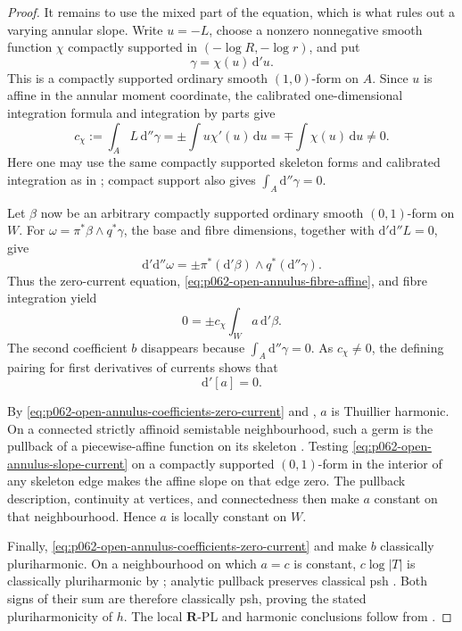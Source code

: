 \begin{proof}
It remains to use the mixed part of the equation, which is what rules out
a varying annular slope.  Write \(u=-L\), choose a nonzero nonnegative
smooth function \(\chi\) compactly supported in
\(( -\log R,-\log r)\), and put
\[
                         \gamma=\chi(u)\,\mathrm d'u.
\]
This is a compactly supported ordinary smooth \((1,0)\)-form on \(A\).
Since \(u\) is affine in the annular moment coordinate, the calibrated
one-dimensional integration formula and integration by parts give
\[
 c_\chi:=\int_A L\,\mathrm d''\gamma
 =\mathord\pm\int u\chi'(u)\,\mathrm du
 =\mathord\mp\int\chi(u)\,\mathrm du\ne0.
\tag{\(***\)}\label{eq:p062-open-annulus-nonzero-pairing}
\]
Here one may use the same compactly supported skeleton forms and
calibrated integration as in ; compact
support also gives \(\int_A\mathrm d''\gamma=0\).

Let \(\beta\) now be an arbitrary compactly supported ordinary smooth
\((0,1)\)-form on \(W\).  For
\(\omega=\pi^*\beta\wedge q^*\gamma\), the base and fibre dimensions,
together with \(\mathrm d'\mathrm d''L=0\), give
\[
 \mathrm d'\mathrm d''\omega
   =\mathord\pm\pi^*(\mathrm d'\beta)\wedge q^*(\mathrm d''\gamma).
\]
Thus the zero-current equation, \eqref{eq:p062-open-annulus-fibre-affine},
and fibre integration yield
\[
 0=\mathord\pm c_\chi\int_Wa\,\mathrm d'\beta.
\]
The second coefficient \(b\) disappears because
\(\int_A\mathrm d''\gamma=0\).  As \(c_\chi\ne0\), the defining
pairing for first derivatives of currents shows that
\[
                              \mathrm d'[a]=0.
\tag{\(\dagger\)}\label{eq:p062-open-annulus-slope-current}
\]

By \eqref{eq:p062-open-annulus-coefficients-zero-current} and
, \(a\) is Thuillier
harmonic.  On a connected strictly affinoid semistable neighbourhood, such
a germ is the pullback of a piecewise-affine function on its skeleton
\cite[Definition~2.3.1 and Definition~2.3.16]{Thu05}.  Testing
\eqref{eq:p062-open-annulus-slope-current} on a compactly supported
\((0,1)\)-form in the interior of any skeleton edge makes the affine slope
on that edge zero.  The pullback description, continuity at vertices, and
connectedness then make \(a\) constant on that neighbourhood.  Hence \(a\)
is locally constant on \(W\).

Finally, \eqref{eq:p062-open-annulus-coefficients-zero-current} and
 make \(b\) classically
pluriharmonic.  On a neighbourhood on which \(a=c\) is constant,
\(c\log|T|\) is classically pluriharmonic by
; analytic
pullback preserves classical psh \cite[Proposition~4.2(6)]{GR25Classical}.
Both signs of their sum are therefore classically psh, proving the stated
pluriharmonicity of \(h\).  The local \(\mathbf R\)-PL and harmonic
conclusions follow from .
\end{proof}

